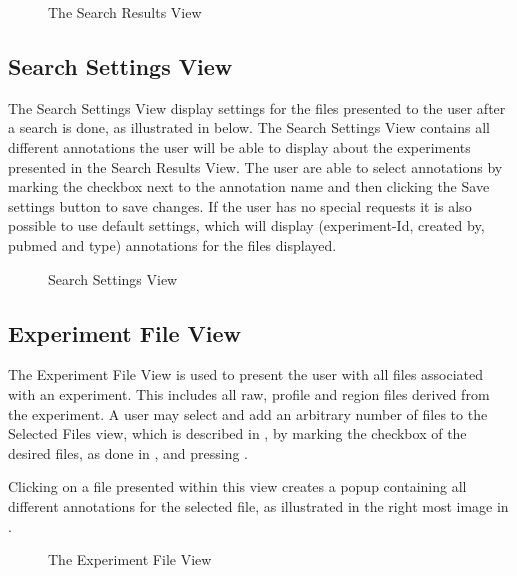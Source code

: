 \begin{figure}[h]
\caption{The Search Results View}
\label{fig:and_search_results_man} 
\end{figure}
\FloatBarrier


\subsection{Search Settings View}\label{sec:search_settings}
The Search Settings View display settings for the files presented to the user after a search is done, as illustrated in   below. The Search Settings View contains all different annotations the user will be able to display about the experiments presented in the Search Results View. The user are able to select annotations by marking the checkbox next to the annotation name and then clicking the Save settings button to save changes. If the user has no special requests it is also possible to use default settings, which will display (experiment-Id, created by, pubmed and type) annotations for the files displayed. 



\begin{figure}[ht]
\caption{Search Settings View}
\label{fig:and_search_settings_man}
\end{figure}
\FloatBarrier


\subsection{Experiment File View}
The Experiment File View is used to present the user with all files associated with an experiment. This includes all raw, profile and region files derived from the experiment. A user may select and add an arbitrary number of files to the Selected Files view, which is described in , by marking the checkbox of the desired files, as done in  , and pressing .

Clicking on a file presented within this view creates a popup containing all different annotations for the selected file, as illustrated in the right most image in .

\begin{figure}[h]
\caption{The Experiment File View}
\label{fig:and_experiment_man}
\end{figure}
\FloatBarrier






